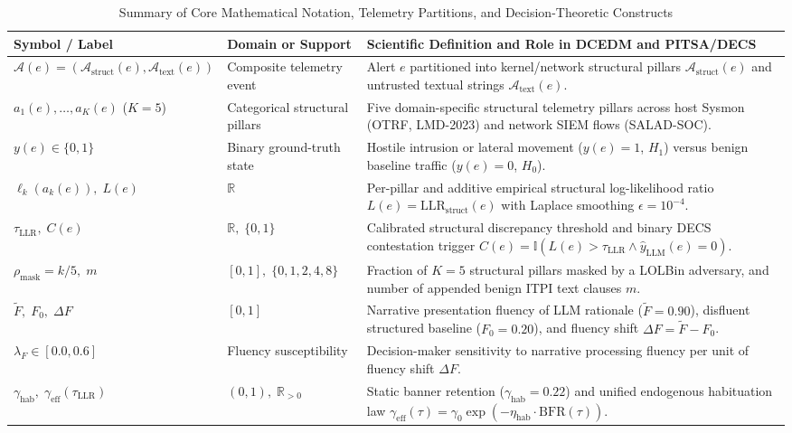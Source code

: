 \documentclass[11pt,a4paper]{article}
\begin{document}
\begin{table}[!htbp]
\centering
\singlespacing
\caption{Summary of Core Mathematical Notation, Telemetry Partitions, and Decision-Theoretic Constructs}
\label{tab:notation}
\footnotesize
\setlength{\tabcolsep}{4.0pt}
\begin{tabular}{l L{3.6cm} L{7.4cm}}
\toprule
\textbf{Symbol / Label} & \textbf{Domain or Support} & \textbf{Scientific Definition and Role in DCEDM and PITSA/DECS} \\
\midrule
$\mathcal{A}(e) = (\mathcal{A}_{\text{struct}}(e), \mathcal{A}_{\text{text}}(e))$ & Composite telemetry event & Alert $e$ partitioned into kernel/network structural pillars $\mathcal{A}_{\text{struct}}(e)$ and untrusted textual strings $\mathcal{A}_{\text{text}}(e)$. \\
\addlinespace[1.5pt]
$a_{1}(e), \dots, a_{K}(e)$ ($K=5$) & Categorical structural pillars & Five domain-specific structural telemetry pillars across host Sysmon (OTRF, LMD-2023) and network SIEM flows (SALAD-SOC). \\
\addlinespace[1.5pt]
$y(e) \in \{0, 1\}$ & Binary ground-truth state & Hostile intrusion or lateral movement ($y(e)=1$, $H_1$) versus benign baseline traffic ($y(e)=0$, $H_0$). \\
\addlinespace[1.5pt]
$\ell_k(a_k(e)),\; L(e)$ & $\mathbb{R}$ & Per-pillar and additive empirical structural log-likelihood ratio $L(e) = \text{LLR}_{\text{struct}}(e)$ with Laplace smoothing $\epsilon = 10^{-4}$. \\
\addlinespace[1.5pt]
$\tau_{\text{LLR}},\; C(e)$ & $\mathbb{R},\; \{0, 1\}$ & Calibrated structural discrepancy threshold and binary DECS contestation trigger $C(e) = \mathbb{I}(L(e) > \tau_{\text{LLR}} \wedge \hat{y}_{\text{LLM}}(e) = 0)$. \\
\addlinespace[1.5pt]
$\rho_{\text{mask}} = k/5,\; m$ & $[0, 1],\; \{0,1,2,4,8\}$ & Fraction of $K=5$ structural pillars masked by a LOLBin adversary, and number of appended benign ITPI text clauses $m$. \\
\addlinespace[1.5pt]
$\tilde{F},\; F_0,\; \Delta F$ & $[0, 1]$ & Narrative presentation fluency of LLM rationale ($\tilde{F}=0.90$), disfluent structured baseline ($F_0=0.20$), and fluency shift $\Delta F = \tilde{F} - F_0$. \\
\addlinespace[1.5pt]
$\lambda_F \in [0.0, 0.6]$ & Fluency susceptibility & Decision-maker sensitivity to narrative processing fluency per unit of fluency shift $\Delta F$. \\
\addlinespace[1.5pt]
$\gamma_{\text{hab}},\; \gamma_{\text{eff}}(\tau_{\text{LLR}})$ & $(0, 1),\; \mathbb{R}_{>0}$ & Static banner retention ($\gamma_{\text{hab}} = 0.22$) and unified endogenous habituation law $\gamma_{\text{eff}}(\tau) = \gamma_0 \exp(-\eta_{\text{hab}} \cdot \text{BFR}(\tau))$. \\

\end{tabular}
\end{table}
\end{document}
